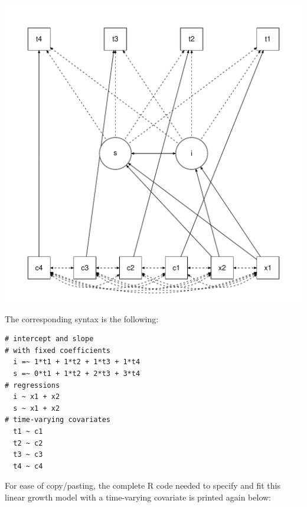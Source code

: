 \includegraphics{figure/growth.pdf}

The corresponding syntax is the following:

\begin{verbatim}
# intercept and slope
# with fixed coefficients
  i =~ 1*t1 + 1*t2 + 1*t3 + 1*t4
  s =~ 0*t1 + 1*t2 + 2*t3 + 3*t4
# regressions
  i ~ x1 + x2
  s ~ x1 + x2
# time-varying covariates
  t1 ~ c1
  t2 ~ c2
  t3 ~ c3
  t4 ~ c4
\end{verbatim}

For ease of copy/pasting, the complete R code needed to specify and fit
this linear growth model with a time-varying covariate is printed again
below:

\begin{Shaded}
\begin{Highlighting}[]
\StringTok{ } 
\end{Highlighting}
\end{Shaded}

